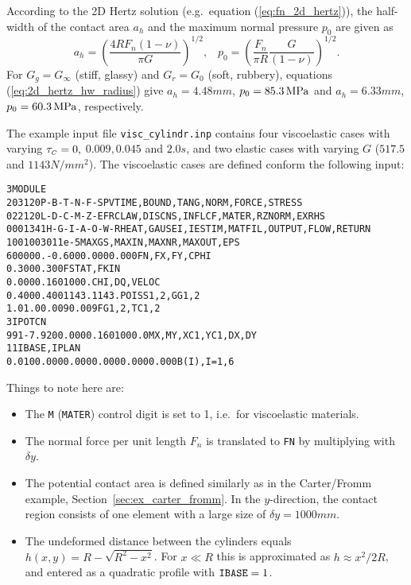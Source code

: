 \documentclass[12pt]{report}
\begin{document}
According to the 2D Hertz solution (e.g.\ equation (\ref{eq:fn_2d_hertz})),
the half-width of the contact area $a_h$ and the maximum normal pressure
$p_0$ are given as
\begin{equation}
\label{eq:2d_hertz_hw_radius}
	a_h = \left( \frac{4 R F_n (1-\nu)}{\pi G}\right)^{1/2}, \;\;\;
	p_0 = \left( \frac{F_n}{\pi R}\frac{G}{(1-\nu)}\right)^{1/2}.
\end{equation}
For $G_g=G_\infty$ (stiff, glassy) and $G_r=G_0$ (soft, rubbery), equations
(\ref{eq:2d_hertz_hw_radius}) give $a_h=4.48\unit{mm}$, $p_0=85.3\,\mathrm{MPa}$ and
$a_h=6.33\unit{mm}$, $p_0=60.3\,\mathrm{MPa}$, respectively.

The example input file {\tt visc\_cylindr.inp} contains four viscoelastic
cases with varying $\tau_{\scriptscriptstyle C}=0,$ $0.009, 0.045$ and $2.0\unit{s}$, and two elastic
cases with varying $G$ ($517.5$ and $1143\unit{N/mm^2}$). The viscoelastic
cases are defined conform the following input:
\begin{alltt}\small
 3  MODULE
  203120     P-B-T-N-F-S        PVTIME, BOUND , TANG  , NORM , FORCE, STRESS
  022120     L-D-C-M-Z-E        FRCLAW, DISCNS, INFLCF, MATER, RZNORM, EXRHS
 0001341   H-G-I-A-O-W-R  HEAT, GAUSEI, IESTIM, MATFIL, OUTPUT, FLOW, RETURN
   100   100    30      1     1e-5     MAXGS , MAXIN , MAXNR , MAXOUT, EPS
 600000.   -0.600    0.000    0.000            FN, FX, FY, CPHI
   0.300    0.300                              FSTAT, FKIN
   0.000    0.160    1000.                     CHI, DQ, VELOC
   0.400    0.400    1143.    1143.            POISS 1,2,  GG 1,2
   1.0      1.0      0.009    0.009            FG 1,2, TC 1,2
    3                                          IPOTCN
  99   1   -7.920   0.000    0.160    1000.0   MX,MY,XC1,YC1,DX,DY
    1    1                                     IBASE, IPLAN
%    QUADRATIC UNDEFORMED DISTANCE
  0.010    0.000     0.000    0.000     0.000     0.000     B(I), I=1, 6
\end{alltt}
Things to note here are:
\begin{itemize}
\item The {\tt M} ({\tt MATER}) control digit is set to 1, i.e.\ for
        viscoelastic materials.
\item The normal force per unit length $F_n$ is translated to {\tt FN}
        by multiplying with $\delta y$.
\item The potential contact area is defined similarly as in the
        Carter/Fromm example, Section~\ref{sec:ex_carter_fromm}. In the
        $y$-direction, the contact region consists of one element with a
        large size of $\delta y=1000\unit{mm}$.
\item The undeformed distance between the cylinders equals
        $h(x,y)=R - \sqrt{R^2-x^2}$. For $x\ll R$ this is
        approximated as $h \approx x^2/2R$, and entered as a quadratic
        profile with ${\tt IBASE}=1$.
\end{itemize}
\end{document}

